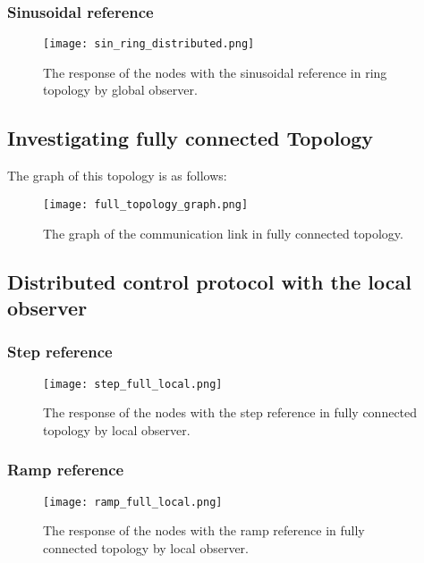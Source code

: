 \subsubsection{Sinusoidal reference}
\begin{figure}[H] %
    \centering
    \texttt{[image: sin\_ring\_distributed.png]} %
    \caption{The response of the nodes with the sinusoidal reference in ring topology by global observer.}
\end{figure}

\subsection{Investigating fully connected Topology}
The graph of this topology is as follows:
\begin{figure}[H] %
    \centering
    \texttt{[image: full\_topology\_graph.png]} %
    \caption{The graph of the communication link in fully connected topology.}
\end{figure}

\subsection{Distributed control protocol with the local observer}
\subsubsection{Step reference}
\begin{figure}[H] %
    \centering
    \texttt{[image: step\_full\_local.png]} %
    \caption{The response of the nodes with the step reference in fully connected topology by local observer.}
\end{figure}


\subsubsection{Ramp reference}
\begin{figure}[H] %
    \centering
    \texttt{[image: ramp\_full\_local.png]} %
    \caption{The response of the nodes with the ramp reference in fully connected topology by local observer.}
\end{figure}

